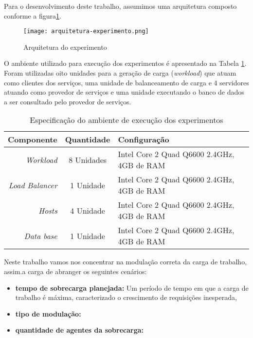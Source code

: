 Para o desenvolvimento deste trabalho, assumimos uma arquitetura composto conforme a figura\ref{fig:arquitetura-experimento}.

\begin{figure}[!htb]
	\centering
	\texttt{[image: arquitetura-experimento.png]}
	\caption{Arquitetura do experimento}
	\label{fig:arquitetura-experimento}
	\fautor
\end{figure}


O ambiente utilizado para execução dos experimentos é apresentado na Tabela \ref{tab:configuracao_maquinas}.
Foram utilizadas oito unidades para a geração de carga (\textit{workload}) que atuam como clientes dos serviços, uma unidade de balanceamento de carga e 4 servidores atuando como provedor de serviços e uma unidade executando o banco de dados a ser consultado pelo provedor de serviços.

\begin{table}[htb]
	\centering
	\caption{Especificação do ambiente de execução dos experimentos}
	\label{tab:configuracao_maquinas}
	\begin{tabularx}{\textwidth}{|r|c|X|} \hline\hline
		\textbf{Componente}    & \textbf{Quantidade} & \textbf{Configuração} \\ \hline
		\textit{Workload}      & 8 Unidades          & Intel Core 2 Quad Q6600 2.4GHz, 4GB de RAM \\
		\textit{Load Balancer} & 1 Unidade           & Intel Core 2 Quad Q6600 2.4GHz, 4GB de RAM \\
		\textit{Hosts}         & 4 Unidade           & Intel Core 2 Quad Q6600 2.4GHz, 4GB de RAM \\
		\textit{Data base}     & 1 Unidade           & Intel Core 2 Quad Q6600 2.4GHz, 4GB de RAM \\
		\hline
	\end{tabularx}
	\fdadospesquisa
\end{table}

Neste trabalho vamos nos concentrar na modulação correta da carga de trabalho, assim.a carga de abranger os seguintes cenários:
\begin{itemize}
	\item \textbf{tempo de sobrecarga planejada:} Um período de tempo em que a carga de trabalho é máxima, caracterizado o crescimento de requisições inesperada,
	\item \textbf{tipo de modulação:}
	\item \textbf{quantidade de agentes da sobrecarga:}
\end{itemize}


